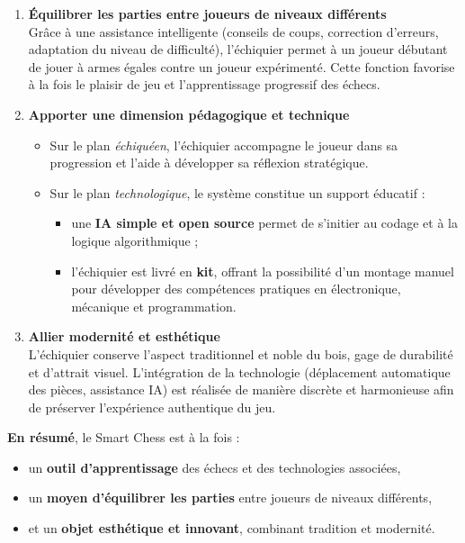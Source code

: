 \documentclass{article}
\begin{document}
\begin{enumerate}
    \item \textbf{Équilibrer les parties entre joueurs de niveaux différents} \\
    Grâce à une assistance intelligente (conseils de coups, correction d’erreurs, adaptation du niveau de difficulté), l’échiquier permet à un joueur débutant de jouer à armes égales contre un joueur expérimenté.  
    Cette fonction favorise à la fois le plaisir de jeu et l’apprentissage progressif des échecs.
    
    \item \textbf{Apporter une dimension pédagogique et technique} \\
    \begin{itemize}
        \item Sur le plan \textit{échiquéen}, l’échiquier accompagne le joueur dans sa progression et l’aide à développer sa réflexion stratégique.
        \item Sur le plan \textit{technologique}, le système constitue un support éducatif :
        \begin{itemize}
            \item une \textbf{IA simple et open source} permet de s’initier au codage et à la logique algorithmique ;
            \item l’échiquier est livré en \textbf{kit}, offrant la possibilité d’un montage manuel pour développer des compétences pratiques en électronique, mécanique et programmation.
        \end{itemize}
    \end{itemize}
    
    \item \textbf{Allier modernité et esthétique} \\
    L’échiquier conserve l’aspect traditionnel et noble du bois, gage de durabilité et d’attrait visuel.  
    L’intégration de la technologie (déplacement automatique des pièces, assistance IA) est réalisée de manière discrète et harmonieuse afin de préserver l’expérience authentique du jeu.
\end{enumerate}

\bigskip
\noindent
\textbf{En résumé}, le Smart Chess est à la fois :
\begin{itemize}
    \item un \textbf{outil d’apprentissage} des échecs et des technologies associées,
    \item un \textbf{moyen d’équilibrer les parties} entre joueurs de niveaux différents,
    \item et un \textbf{objet esthétique et innovant}, combinant tradition et modernité.
\end{itemize}
\end{document}
